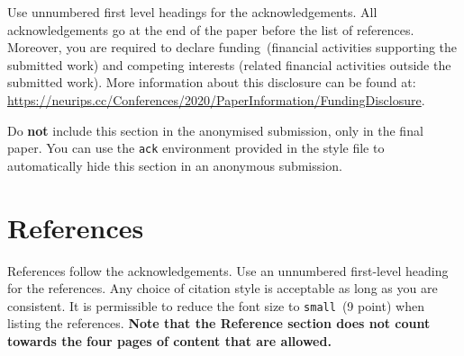 \documentclass{article}
\begin{document}
\begin{ack}
Use unnumbered first level headings for the acknowledgements. All
acknowledgements go at the end of the paper before the list of
references. Moreover, you are required to declare funding~(financial
activities supporting the submitted work) and competing interests
(related financial activities outside the submitted work).
%
More information about this disclosure can be found at:
\url{https://neurips.cc/Conferences/2020/PaperInformation/FundingDisclosure}.

Do \textbf{not} include this section in the anonymised submission, only
in the final paper. You can use the \texttt{ack} environment provided in
the style file to automatically hide this section in an anonymous
submission.
\end{ack}

\section*{References}

References follow the acknowledgements. Use an unnumbered first-level heading for
the references. Any choice of citation style is acceptable as long as you are
consistent. It is permissible to reduce the font size to \verb+small+~(9 point)
when listing the references.
%
\textbf{Note that the Reference section does not count towards the four pages of content that are allowed.}
\end{document}
